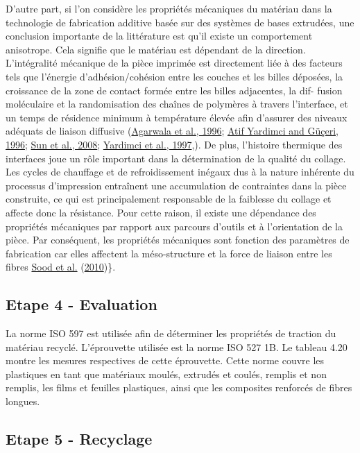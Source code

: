 \documentclass[
]{article}
\begin{document}
D'autre part, si l'on considère les propriétés mécaniques du matériau
dans la technologie de fabrication additive basée sur des systèmes de
bases extrudées, une conclusion importante de la littérature est qu'il
existe un comportement anisotrope. Cela signifie que le matériau est
dépendant de la direction. L'intégralité mécanique de la pièce imprimée
est directement liée à des facteurs tels que l'énergie
d'adhésion/cohésion entre les couches et les billes déposées, la
croissance de la zone de contact formée entre les billes adjacentes, la
dif- fusion moléculaire et la randomisation des chaînes de polymères à
travers l'interface, et un temps de résidence minimum à température
élevée afin d'assurer des niveaux adéquats de liaison diffusive
(\protect\hyperlink{ref-Agarwala1996}{Agarwala et al., 1996};
\protect\hyperlink{ref-AtifYardimci1996}{Atif Yardimci and Güçeri,
1996}; \protect\hyperlink{ref-Sun2008}{Sun et al., 2008};
\protect\hyperlink{ref-Yardimci1997}{Yardimci et al., 1997},). De plus,
l'histoire thermique des interfaces joue un rôle important dans la
détermination de la qualité du collage. Les cycles de chauffage et de
refroidissement inégaux dus à la nature inhérente du processus
d'impression entraînent une accumulation de contraintes dans la pièce
construite, ce qui est principalement responsable de la faiblesse du
collage et affecte donc la résistance. Pour cette raison, il existe une
dépendance des propriétés mécaniques par rapport aux parcours d'outils
et à l'orientation de la pièce. Par conséquent, les propriétés
mécaniques sont fonction des paramètres de fabrication car elles
affectent la méso-structure et la force de liaison entre les fibres
\protect\hyperlink{ref-Sood2010}{Sood et al.}
(\protect\hyperlink{ref-Sood2010}{2010})\}.

\hypertarget{etape-4---evaluation}{%
\subsection{Etape 4 - Evaluation}\label{etape-4---evaluation}}

La norme ISO 597 est utilisée afin de déterminer les propriétés de
traction du matériau recyclé. L'éprouvette utilisée est la norme ISO 527
1B. Le tableau 4.20 montre les mesures respectives de cette éprouvette.
Cette norme couvre les plastiques en tant que matériaux moulés, extrudés
et coulés, remplis et non remplis, les films et feuilles plastiques,
ainsi que les composites renforcés de fibres longues.

\hypertarget{etape-5---recyclage}{%
\subsection{Etape 5 - Recyclage}\label{etape-5---recyclage}}
\end{document}
